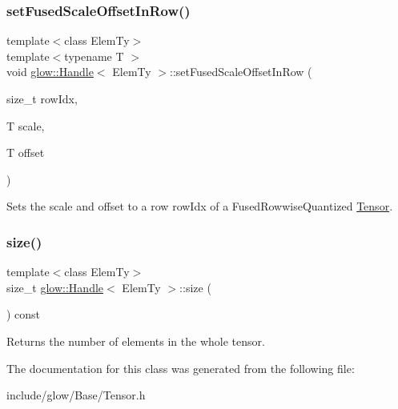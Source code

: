 \subsubsection{\texorpdfstring{set\+Fused\+Scale\+Offset\+In\+Row()}{setFusedScaleOffsetInRow()}}
{\footnotesize\ttfamily template$<$class Elem\+Ty$>$ \\
template$<$typename T $>$ \\
void \hyperlink{classglow_1_1_handle}{glow\+::\+Handle}$<$ Elem\+Ty $>$\+::set\+Fused\+Scale\+Offset\+In\+Row (\begin{DoxyParamCaption}\item[{size\+\_\+t}]{row\+Idx,  }\item[{T}]{scale,  }\item[{T}]{offset }\end{DoxyParamCaption})\hspace{0.3cm}{\ttfamily [inline]}}

Sets the {\ttfamily scale} and {\ttfamily offset} to a row {\ttfamily row\+Idx} of a Fused\+Rowwise\+Quantized \hyperlink{classglow_1_1_tensor}{Tensor}. \mbox{\label{classglow_1_1_handle_a7322ebb8b8d2d57f4ea9ec93f238b7a5}} 
\subsubsection{\texorpdfstring{size()}{size()}}
{\footnotesize\ttfamily template$<$class Elem\+Ty$>$ \\
size\+\_\+t \hyperlink{classglow_1_1_handle}{glow\+::\+Handle}$<$ Elem\+Ty $>$\+::size (\begin{DoxyParamCaption}{ }\end{DoxyParamCaption}) const\hspace{0.3cm}{\ttfamily [inline]}}

\begin{DoxyReturn}{Returns}
the number of elements in the whole tensor. 
\end{DoxyReturn}


The documentation for this class was generated from the following file\+:\begin{DoxyCompactItemize}
\item 
include/glow/\+Base/Tensor.\+h\end{DoxyCompactItemize}
